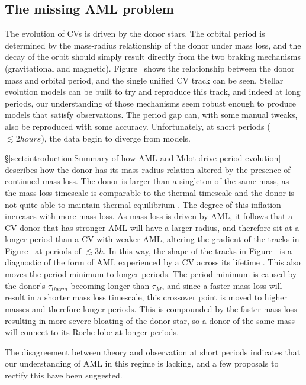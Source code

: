 \subsection{The missing AML problem}

The evolution of CVs is driven by the donor stars. The orbital period is determined by the mass-radius relationship of the donor under mass loss, and the decay of the orbit should simply result directly from the two braking mechanisms (gravitational and magnetic). Figure~ shows the relationship between the donor mass and orbital period, and the single unified CV track can be seen. Stellar evolution models can be built to try and reproduce this track, and indeed at long periods, our understanding of those mechanisms seem robust enough to produce models that satisfy observations. The period gap can, with some manual tweaks, also be reproduced with some accuracy. Unfortunately, at short periods ($\lesssim 2 hours$), the data begin to diverge from models. 

\S\ref{sect:introduction:Summary of how AML and Mdot drive period evolution} describes how the donor has its mass-radius relation altered by the presence of continued mass loss. The donor is larger than a singleton of the same mass, as the mass loss timescale is comparable to the thermal timescale and the donor is not quite able to maintain thermal equilibrium \citep{knigge11}. The degree of this inflation increases with more mass loss. As mass loss is driven by AML, it follows that a CV donor that has stronger AML will have a larger radius, and therefore sit at a longer period than a CV with weaker AML, altering the gradient of the tracks in Figure~ at periods of $\lesssim 3h$. In this way, the shape of the tracks in Figure~ is a diagnostic of the form of AML experienced by a CV across its lifetime \citep{knigge11}.
This also moves the period minimum to longer periods. The period minimum is caused by the donor's $\tau_{therm}$ becoming longer than $\tau_{\dot M}$, and since a faster mass loss will result in a shorter mass loss timescale, this crossover point is moved to higher masses and therefore longer periods. This is compounded by the faster mass loss resulting in more severe bloating of the donor star, so a donor of the same mass will connect to its Roche lobe at longer periods. 

The disagreement between theory and observation at short periods indicates that our understanding of AML in this regime is lacking, and a few proposals to rectify this have been suggested.


